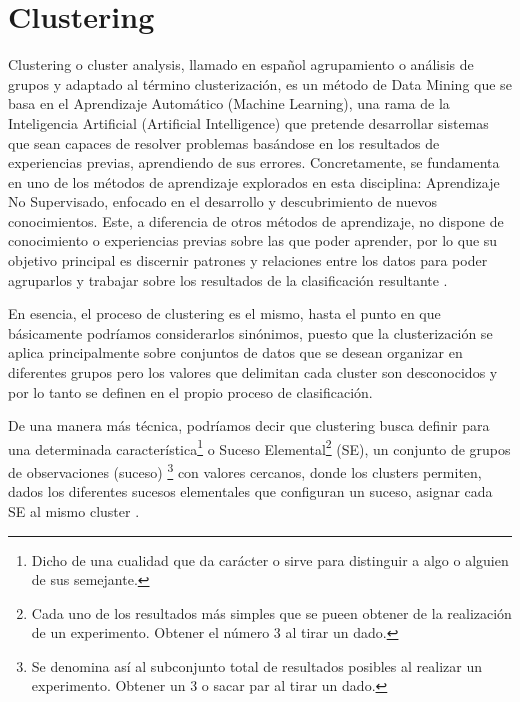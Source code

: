 \documentclass[10pt, a4paper]{article}
\begin{document}


\section{Clustering} \label{clustering}

Clustering o cluster analysis, llamado en español agrupamiento o análisis de grupos y adaptado al término clusterización, es un método de Data Mining que se basa en el Aprendizaje Automático (Machine Learning), una rama de la Inteligencia Artificial (Artificial Intelligence) que pretende desarrollar sistemas que sean capaces de resolver problemas basándose en los resultados de experiencias previas, aprendiendo de sus errores. Concretamente, se fundamenta en uno de los métodos de aprendizaje explorados en esta disciplina: Aprendizaje No Supervisado, enfocado en el desarrollo y descubrimiento de nuevos conocimientos. Este, a diferencia de otros métodos de aprendizaje, no dispone de conocimiento o experiencias previas sobre las que poder aprender, por lo que su objetivo principal es discernir patrones y relaciones entre los datos para poder agruparlos y trabajar sobre los resultados de la clasificación resultante \cite{7}.

En esencia, el proceso de clustering es el mismo, hasta el punto en que básicamente podríamos considerarlos sinónimos, puesto que la clusterización se aplica principalmente sobre conjuntos de datos que se desean organizar en diferentes grupos pero los valores que delimitan cada cluster son desconocidos y por lo tanto se definen en el propio proceso de clasificación.

De una manera más técnica, podríamos decir que clustering busca definir para una determinada característica\footnote{Dicho de una cualidad que da carácter o sirve para distinguir a algo o alguien de sus semejante.} o Suceso Elemental\footnote{Cada uno de los resultados más simples que se pueen obtener de la realización de un experimento. Obtener el número 3 al tirar un dado.} (SE), un conjunto de grupos de observaciones (suceso) \footnote{Se denomina así al subconjunto total de resultados posibles al realizar un experimento. Obtener un 3 o sacar par al tirar un dado.} con valores cercanos, donde los clusters permiten, dados los diferentes sucesos elementales que configuran un suceso, asignar cada SE al mismo cluster \cite{8}.
\end{document}
